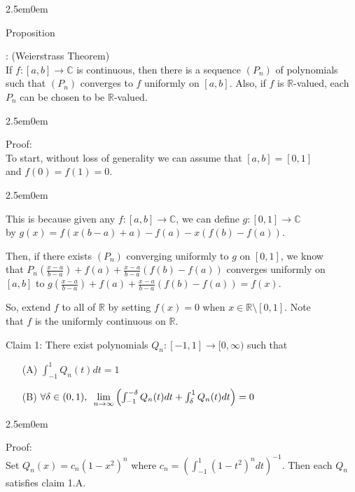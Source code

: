 \documentclass{book}
\newcommand{\hTwo}{%
   \color{MidnightBlue}%
   \fontsize{13}{15}\selectfont%
}
\newcommand{\hThree}{%
   \color{PineGreen!85!Orange}
   \fontsize{13}{15}\selectfont%
}
\newcommand{\hFour}{%
   \color{Cerulean}
   \fontsize{12}{14}\selectfont%
}
\newenvironment{myIndent}{%
   \begin{adjustwidth}{2.5em}{0em}%
}{%
   \end{adjustwidth}%
}
\newcommand{\myHS}{ \hspace{0.5em}}
\newcounter{PropNumber}
\newcommand{\propCount}[1][1]{%
   \addtocounter{PropNumber}{#1}%
   \thePropNumber%
}
\newcommand{\retTwo}{\hfill\bigbreak}
\begin{document}
{\begin{myIndent}\hTwo
   Proposition \propCount: (Weierstrass Theorem)\\
   If $f: [a, b] \longrightarrow \mathbb{C}$ is continuous, then there is a sequence $(P_n)$ of polynomials\\ such that $(P_n)$ converges to $f$ uniformly on $[a, b]$. Also, if $f$ is $\mathbb{R}$-valued, each\\ $P_n$ can be chosen to be $\mathbb{R}$-valued.

   {\begin{myIndent}\hThree
      Proof:\\
      To start, without loss of generality we can assume that $[a, b] = [0, 1]$\\ and $f(0) = f(1) = 0$. 
      
      {\begin{myIndent}\hFour
         This is because given any $f: [a,b] \longrightarrow \mathbb{C}$,  we can define $g:[0,1]\longrightarrow \mathbb{C}$\\ by $g(x) = f(x(b-a)+a) - f(a) - x(f(b) - f(a))$.\retTwo
   
         Then, if there exists $(P_n)$ converging uniformly to $g$ on $[0, 1]$, we know\\ that $P_n(\frac{x-a}{b-a}) + f(a) + \frac{x-a}{b-a}(f(b) - f(a))$ converges uniformly on\\ $[a, b]$ to $g(\frac{x-a}{b-a}) + f(a) + \frac{x-a}{b-a}(f(b)-f(a)) = f(x)$.\retTwo
      \end{myIndent}}

      So, extend $f$ to all of $\mathbb{R}$ by setting $f(x) = 0$ when $x \in \mathbb{R} \setminus [0, 1]$. Note\\ that $f$ is the uniformly continuous on $\mathbb{R}$.\retTwo

      Claim 1: There exist polynomials $Q_n: [-1, 1] \longrightarrow [0, \infty)$ such that
      \begin{itemize}
         \item[(A)] $\int_{-1}^{1} Q_n(t)dt = 1$
         \item[(B)] $\forall \delta \in (0, 1),\myHS \lim\limits_{n\rightarrow \infty}\left(\int_{-1}^{-\delta}Q_n(t)dt + \int_{\delta}^1 Q_n(t)dt\right) = 0$
      \end{itemize} 

      {\begin{myIndent}\hFour
         Proof:\\ [-4pt]
         Set $Q_n(x) = c_n(1-x^2)^n$ where $c_n = \left(\int_{-1}^1 (1-t^2)^ndt\right)^{-1}$\hspace{-0.9em}.\hspace{0.2em} Then each $Q_n$\\ [-3pt] satisfies claim 1.A.\retTwo


\end{myIndent}}
\end{myIndent}}
\end{myIndent}}
\end{document}
